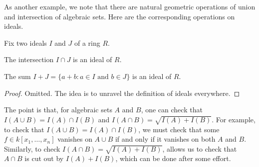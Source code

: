 \documentclass[../notes.tex]{subfiles}
\begin{document}
As another example, we note that there are natural geometric operations of union and intersection of algebraic sets. Here are the corresponding operations on ideals.
\begin{lemma} \label{lem:union-intersection-algebraic}
	Fix two ideals $I$ and $J$ of a ring $R$.
	\begin{listalph}
		\item The intersection $I\cap J$ is an ideal of $R$.
		\item The sum $I+J=\{a+b:a\in I\text{ and }b\in J\}$ is an ideal of $R$.
	\end{listalph}
\end{lemma}
\begin{proof}
	Omitted. The idea is to unravel the definition of ideals everywhere.
\end{proof}
The point is that, for algebraic sets $A$ and $B$, one can check that $I(A\cup B)=I(A)\cap I(B)$ and $I(A\cap B)=\sqrt{I(A)+I(B)}$. For example, to check that $I(A\cup B)=I(A)\cap I(B)$, we must check that some $f\in k[x_1,\ldots,x_n]$ vanishes on $A\cup B$ if and only if it vanishes on both $A$ and $B$. Similarly, to check $I(A\cap B)=\sqrt{I(A)+I(B)}$,  allows us to check that $A\cap B$ is cut out by $I(A)+I(B)$, which can be done after some effort.
\end{document}
